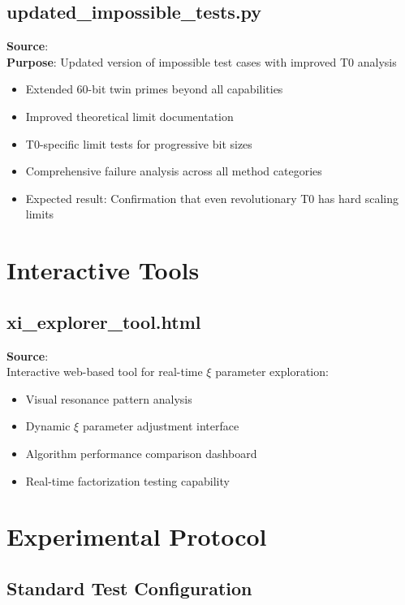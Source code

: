 	\subsection{updated\_impossible\_tests.py}
	\textbf{Source}: \\
	\textbf{Purpose}: Updated version of impossible test cases with improved T0 analysis
	\begin{itemize}
		\item Extended 60-bit twin primes beyond all capabilities
		\item Improved theoretical limit documentation
		\item T0-specific limit tests for progressive bit sizes
		\item Comprehensive failure analysis across all method categories
		\item Expected result: Confirmation that even revolutionary T0 has hard scaling limits
	\end{itemize}
	
	\section{Interactive Tools}
	
	\subsection{xi\_explorer\_tool.html}
	\textbf{Source}: \\
	Interactive web-based tool for real-time $\xi$ parameter exploration:
	\begin{itemize}
		\item Visual resonance pattern analysis
		\item Dynamic $\xi$ parameter adjustment interface
		\item Algorithm performance comparison dashboard
		\item Real-time factorization testing capability
	\end{itemize}
	
	\section{Experimental Protocol}
	
	\subsection{Standard Test Configuration}
	
